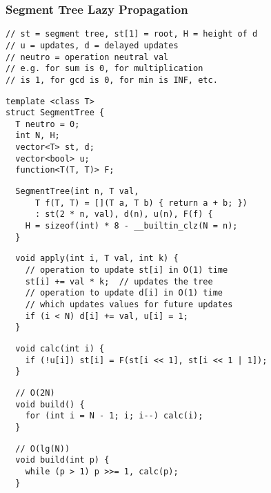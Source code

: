 \documentclass[twoside]{article}
\begin{document}
\begin{multicols*}{2}
\subsubsection*{Segment Tree Lazy Propagation}
\begin{verbatim}
// st = segment tree, st[1] = root, H = height of d
// u = updates, d = delayed updates
// neutro = operation neutral val
// e.g. for sum is 0, for multiplication
// is 1, for gcd is 0, for min is INF, etc.
\end{verbatim}
\vspace{-12pt}
\begin{verbatim}
template <class T>
struct SegmentTree {
  T neutro = 0;
  int N, H;
  vector<T> st, d;
  vector<bool> u;
  function<T(T, T)> F;
\end{verbatim}
\vspace{-12pt}
\begin{verbatim}
  SegmentTree(int n, T val,
      T f(T, T) = [](T a, T b) { return a + b; })
      : st(2 * n, val), d(n), u(n), F(f) {
    H = sizeof(int) * 8 - __builtin_clz(N = n);
  }
  \end{verbatim}
\vspace{-12pt}
\begin{verbatim}
  void apply(int i, T val, int k) {
    // operation to update st[i] in O(1) time
    st[i] += val * k;  // updates the tree
    // operation to update d[i] in O(1) time
    // which updates values for future updates
    if (i < N) d[i] += val, u[i] = 1;
  }
\end{verbatim}
\vspace{-12pt}
\begin{verbatim}
  void calc(int i) {
    if (!u[i]) st[i] = F(st[i << 1], st[i << 1 | 1]);
  }
\end{verbatim}
\vspace{-12pt}
\begin{verbatim}
  // O(2N)
  void build() {
    for (int i = N - 1; i; i--) calc(i);
  }
\end{verbatim}
\vspace{-12pt}
\begin{verbatim}
  // O(lg(N))
  void build(int p) {
    while (p > 1) p >>= 1, calc(p);
  }
\end{verbatim}
\vspace{-12pt}

\end{multicols*}
\end{document}
